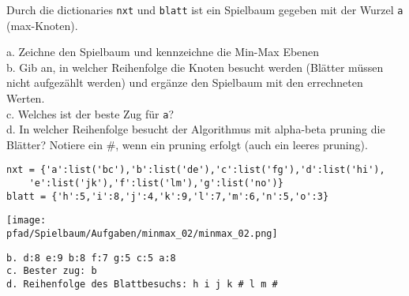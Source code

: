\question[6]
Durch die dictionaries \texttt{nxt} und \texttt{blatt} ist ein Spielbaum
 gegeben mit der Wurzel \texttt{a} (max-Knoten).

a. Zeichne den Spielbaum und kennzeichne die Min-Max Ebenen \\
b. Gib an, in welcher Reihenfolge die Knoten besucht werden (Blätter müssen nicht aufgezählt werden)
 und ergänze den Spielbaum mit den errechneten Werten. \\
c. Welches ist der beste Zug für \texttt{a}? \\
d. In welcher Reihenfolge besucht der Algorithmus mit alpha-beta pruning die Blätter? Notiere ein \#, wenn
ein pruning erfolgt (auch ein leeres pruning).

\begin{lstlisting}
nxt = {'a':list('bc'),'b':list('de'),'c':list('fg'),'d':list('hi'),
    'e':list('jk'),'f':list('lm'),'g':list('no')}
blatt = {'h':5,'i':8,'j':4,'k':9,'l':7,'m':6,'n':5,'o':3}
\end{lstlisting}
\begin{solutionbox}{10cm}
\texttt{[image: \\pfad/Spielbaum/Aufgaben/minmax\_02/minmax\_02.png]}
\begin{lstlisting}
b. d:8 e:9 b:8 f:7 g:5 c:5 a:8
c. Bester zug: b
d. Reihenfolge des Blattbesuchs: h i j k # l m #
\end{lstlisting}
\end{solutionbox}

